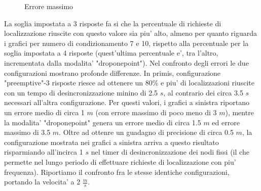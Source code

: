 \documentclass[Lau,binding=0.6cm]{sapthesis}
\begin{document}
\begin{figure}[H]
    \centering
    \hfill
    \caption{Errore massimo}
\end{figure}
La soglia impostata a 3 risposte fa si che la percentuale di richieste di localizzazione riuscite con questo valore sia piu' alto, almeno per quanto riguarda i grafici per numero di condizionamento 7 e 10, rispetto alla percentuale per la soglia impostata a 4 risposte (quest'ultima percentuale e', tra l'altro, incrementata dalla modalita' "droponepoint").
Nel confronto degli errori le due configurazioni mostrano profonde differenze. In primis, configurazione "preemptive"-3 risposte riesce ad ottenere un 80\% e piu' di localizzazioni riuscite con un tempo di desincronizzazione minino di 2.5 $s$, al contrario dei circa 3.5 $s$ necessari all'altra configurazione. Per questi valori, i grafici a sinistra riportano un errore medio di circa 1 $m$ (con errore massimo di poco meno di 3 $m$), mentre la modalita' "droponepoint" genera un errore medio di circa 1.5 $m$ ed errore massimo di 3.5 $m$.
Oltre ad ottenre un guadagno di precisione di circa 0.5 $m$, la configurazione mostrata nei grafici a sinistra arriva a questo risultato risparmiando all'incirca 1 $s$ nel timer di desincronizzazione dei nodi fissi (il che permette nel lungo periodo di effettuare richieste di localizzazione con piu' frequenza).
Riportiamo il confronto fra le stesse identiche configurazioni, portando la velocita' a 2 $\frac{m}{s}$.
\end{document}
